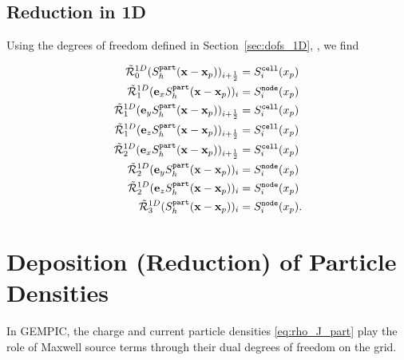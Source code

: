 \documentclass[11pt]{article}
\renewcommand{\part}{\texttt{part}}
\newcommand{\cell}{\texttt{cell}}
\newcommand{\node}{\texttt{node}}
\begin{document}
\subsection{Reduction in 1D}

Using the degrees of freedom defined in Section~\ref{sec:dofs_1D}, , we find 

$$
\begin{aligned}
    \tcR^{1D}_0(S^\part_h(\mathbf{x}-\mathbf{x}_p))_{\iph}           &= S^\cell_i(x_p) \\
    \tcR^{1D}_1(\mathbf{e}_x S^\part_h(\mathbf{x}-\mathbf{x}_p))_{i} &= S^\node_i(x_p) \\
    \tcR^{1D}_1(\mathbf{e}_y S^\part_h(\mathbf{x}-\mathbf{x}_p))_{\iph} &= S^\cell_i(x_p) \\
    \tcR^{1D}_1(\mathbf{e}_z S^\part_h(\mathbf{x}-\mathbf{x}_p))_{\iph} &= S^\cell_i(x_p) \\
    \tcR^{1D}_2(\mathbf{e}_x S^\part_h(\mathbf{x}-\mathbf{x}_p))_{\iph} &= S^\cell_i(x_p) \\
    \tcR^{1D}_2(\mathbf{e}_y S^\part_h(\mathbf{x}-\mathbf{x}_p))_{i}   &= S^\node_i(x_p) \\
    \tcR^{1D}_2(\mathbf{e}_z S^\part_h(\mathbf{x}-\mathbf{x}_p))_{i}    &= S^\node_i(x_p) \\
    \tcR^{1D}_3(S^\part_h(\mathbf{x}-\mathbf{x}_p))_{i}                 &= S^\node_i(x_p).
\end{aligned}
$$

\section{Deposition (Reduction) of Particle Densities }
\label{sec:deposition_of_part_densities}

In GEMPIC, the charge and current particle densities \ref{eq:rho_J_part}
play the role of Maxwell source terms through their dual degrees of freedom 
on the grid. 
\end{document}
